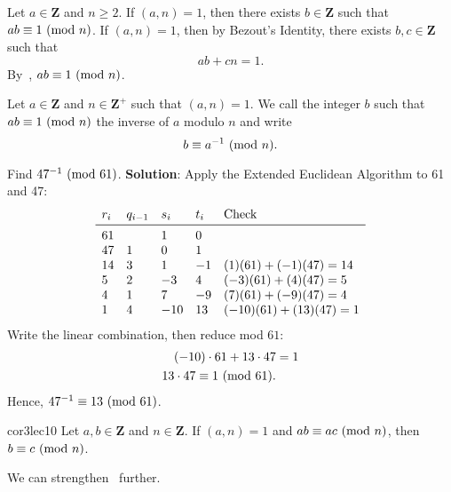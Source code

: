 \begin{Proposition}{}{}
    Let $ a\in\mathbf{Z} $ and $ n\ge 2 $. If $ (a,n)=1 $, then there exists $ b\in\mathbf{Z} $ such that
    $ ab\equiv 1\ (\mathrm{mod}\ n) $.
    \tcblower{}
    If $ (a,n)=1 $, then by Bezout's Identity, there exists $ b,c\in\mathbf{Z} $ such that
    \[ ab+cn=1. \]
    By~, $ ab\equiv 1\ (\mathrm{mod}\ n) $.
\end{Proposition}
\begin{Definition}{}{}
    Let $ a\in\mathbf{Z} $ and $ n\in\mathbf{Z}^+ $ such that $ (a,n)=1 $. We call the integer $ b $
    such that $ ab\equiv 1\ (\mathrm{mod}\ n) $ the inverse of $ a $ modulo $ n $ and write
    \[ b\equiv a^{-1}\ (\mathrm{mod}\ n). \]
\end{Definition}
\begin{Example}{}{}
    Find $ 47^{-1}\ (\mathrm{mod}\ 61) $.
    \tcblower{}
    \textbf{Solution}: Apply the Extended Euclidean Algorithm to 61 and 47:
    \[ \begin{array}{lllll}
            r_i & q_{i-1} & s_i & t_i & \text{Check}         \\
            \midrule
            61  &         & 1   & 0                          \\
            47  & 1       & 0   & 1                          \\
            14  & 3       & 1   & -1  & (1)(61)+(-1)(47)=14  \\
            5   & 2       & -3  & 4   & (-3)(61)+(4)(47)=5   \\
            4   & 1       & 7   & -9  & (7)(61)+(-9)(47)=4   \\
            1   & 4       & -10 & 13  & (-10)(61)+(13)(47)=1 \\
        \end{array} \]
    Write the linear combination, then reduce mod $61$:
    \begin{align*}
        (-10)\cdot 61+13\cdot 47 & =1 \\
        13\cdot 47\equiv 1\ (\mathrm{mod}\ 61).
    \end{align*}
    Hence, $ 47^{-1}\equiv 13\ (\mathrm{mod}\ 61) $.
\end{Example}
\begin{Corollary}{}{cor3lec10}
    Let $ a,b\in\mathbf{Z} $ and $ n\in\mathbf{Z} $. If $ (a,n)=1 $ and $ ab\equiv ac\ (\mathrm{mod}\ n) $,
    then $ b\equiv c\ (\mathrm{mod}\ n) $.
\end{Corollary}
We can strengthen~ further.
